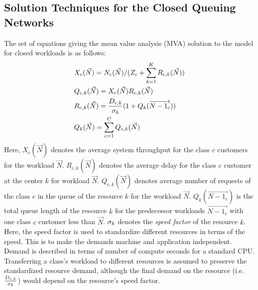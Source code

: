   \subsection{Solution Techniques for the Closed Queuing Networks  }   
 The set of equations giving the mean value analysis (MVA) solution to the model for closed workloads is as follows: 
\begin{align} 
& X_c(\vec{N})=N_c(\vec{N})/(Z_c+\sum_{k=1}^K R_{c,k}(\vec{N})) \label{eq:queuing-model1} \\
& Q_{c,k}(\vec{N})=X_c(\vec{N}) R_{c,k}(\vec{N}) \label{eq:queuing-model2} \\
& R_{c,k}(\vec{N}) = \frac{D_{c,k}}{\sigma_k} (1+Q_k(\overrightarrow{N-1_c})) \label{eq:queuing-model3} \\
& Q_k(\vec{N})=\sum_{c=1}^{C} Q_{c,k}(\vec{N})  \label{eq:queuing-model4}  
\end{align}  
    Here, $X_c(\vec{N})$ denotes the average system throughput for the class $c$ customers for the workload $\vec{N}$.
  $R_{c,k}(\vec{N})$ denotes the average delay for the class $c$ customer at the center $k$ for workload $\vec{N}$.
   $Q_{c,k}(\vec{N})$ denotes average number of requests of the class $c$ in the queue of the resource $k$ for the workload $\vec{N}$.
    $Q_k(\overrightarrow{N-1_c})$ is the total queue length of the resource $k$ for the predecessor workloads $\overrightarrow{N-1_c}$ with one class $c$ customer less than $\vec{N}$. 
 $\sigma_k$ denotes the \textit{speed factor} of the resource $k$. 
 Here, the speed factor is used to standardize different resources in terms of the speed. This is to make the demands machine and application independent. Demand is described in terms of number of compute seconds for a standard CPU. Transferring a class's workload to different resources is assumed to preserve the standardized resource demand, although the final demand on the resource (i.e. $\frac{D_{c,k}}{\sigma_k}$) would depend on the resource's speed factor.  
 
